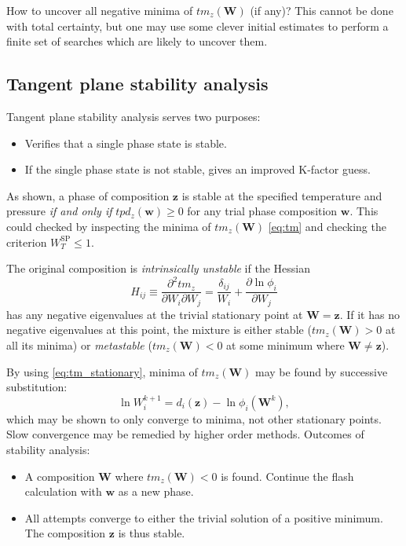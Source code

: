 \documentclass[internal,english]{sintefmemo2012}
\newcommand*{\vektor}[1]{\boldsymbol{#1}}%
\begin{document}
How to uncover all negative minima of $\mathit{tm}_z(\vektor{W})$ (if any)?
This cannot be done with total certainty, but one may use some clever initial
estimates to perform a finite set of searches which are likely to uncover
them. 

\subsection{Tangent plane stability analysis}

Tangent plane stability analysis serves two purposes:
\begin{itemize}
  \item Verifies that a single phase state is stable.
  \item If the single phase state is not stable, gives an improved K-factor guess.
\end{itemize}
As shown, a phase of composition $\vektor{z}$ is stable at the specified temperature and pressure \textit{if and only if}
$tpd_z(\vektor{w}) \geq 0$ for any trial phase composition $\vektor{w}$. This could checked by inspecting the minima of 
$\mathit{tm}_z(\vektor{W})$ \eqref{eq:tm} and checking the criterion
$W_T^\text{SP} \leq 1$. 

The original composition is \textit{intrinsically unstable} if the Hessian 
\begin{equation}
  H_{ij} \equiv \frac{\partial^2 \mathit{tm}_z}{\partial W_i \partial W_j} 
  = \frac{\delta_{ij}}{W_i} + \frac{\partial \ln \phi_i}{\partial W_j}
  \label{}
\end{equation}
has any negative eigenvalues at the trivial stationary point at $\vektor{W}=\vektor{z}$. If it has no negative eigenvalues at 
this point, the mixture is either stable ($\mathit{tm}_z(\vektor{W}) > 0$ at all its minima) or 
\textit{metastable} ($\mathit{tm}_z(\vektor{W}) < 0$ at some minimum where $\vektor{W}\neq \vektor{z}$).

By using \eqref{eq:tm_stationary}, minima of $\mathit{tm}_z(\vektor{W})$ may be found by successive substitution:
\begin{equation}
  \ln W_i^{k+1} = d_i(\vektor{z}) - \ln \phi_i \left( \vektor{W}^k \right),
  \label{}
\end{equation}
which may be shown to only converge to minima, not other stationary points. Slow convergence may be remedied by higher order 
methods.
Outcomes of stability analysis:
\begin{itemize}
  \item A composition $\vektor{W}$ where $\mathit{tm}_z(\vektor{W}) < 0$ is found. Continue the flash calculation with $\vektor{w}$ 
    as a new phase.
  \item All attempts converge to either the trivial solution of a positive minimum. The composition $\vektor{z}$ is thus stable.
\end{itemize}
\end{document}
